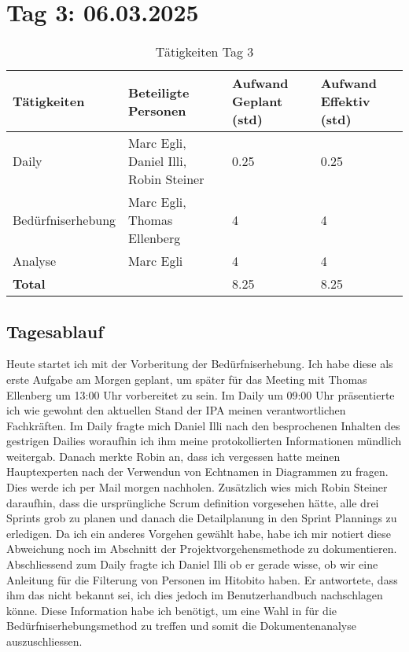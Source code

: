 \section{Tag 3: 06.03.2025}
\begin{table}[H]
    \begin{tabular}{|L{0.4\textwidth}|C{60pt}|C{60pt}|C{60pt}|}
        \hline
        \color{white}Tätigkeiten & \color{white}Beteiligte \color{white}Personen & \color{white}Aufwand Geplant (std) & \color{white}Aufwand Effektiv (std) \\
        \hline
        Daily &  Marc Egli, Daniel Illi, Robin Steiner & 0.25 & 0.25 \\
        \hline
        Bedürfniserhebung & Marc Egli, Thomas Ellenberg & 4 & 4 \\
        \hline
        Analyse & Marc Egli & 4 & 4 \\
        \hline
        \textbf{Total} &   & 8.25 & 8.25 \\
        \hline
    \end{tabular}
    \caption{Tätigkeiten Tag 3}
\end{table}

\subsection*{Tagesablauf}
Heute startet ich mit der Vorberitung der Bedürfniserhebung. Ich habe diese als erste Aufgabe am Morgen geplant,
um später für das Meeting mit Thomas Ellenberg um 13:00 Uhr vorbereitet zu sein. Im Daily um 09:00 Uhr präsentierte ich wie gewohnt den 
aktuellen Stand der IPA meinen verantwortlichen Fachkräften. Im Daily fragte mich Daniel Illi nach den besprochenen Inhalten des gestrigen Dailies
woraufhin ich ihm meine protokollierten Informationen mündlich weitergab. Danach merkte Robin an, dass ich vergessen hatte meinen Hauptexperten nach der 
Verwendun von Echtnamen in Diagrammen zu fragen. Dies werde ich per Mail morgen nachholen. Zusätzlich wies mich Robin Steiner daraufhin, dass die ursprüngliche
Scrum definition vorgesehen hätte, alle drei Sprints grob zu planen und danach die Detailplanung in den Sprint Plannings zu erledigen. Da ich ein anderes Vorgehen gewählt
habe, habe ich mir notiert diese Abweichung noch im Abschnitt der Projektvorgehensmethode zu dokumentieren. Abschliessend zum Daily fragte ich Daniel Illi ob er gerade
wisse, ob wir eine Anleitung für die Filterung von Personen im Hitobito haben. Er antwortete, dass ihm das nicht bekannt sei, ich dies jedoch im Benutzerhandbuch nachschlagen
könne. Diese Information habe ich benötigt, um eine Wahl in für die Bedürfniserhebungsmethod zu treffen und somit die Dokumentenanalyse
auszuschliessen.

